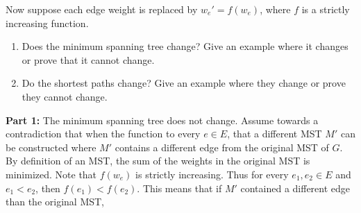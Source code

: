 \documentclass[11pt]{article}
\begin{document}
\begin{flushleft}
	Now suppose each edge weight is replaced by $w_e'=f(w_e)$,
	where $f$ is a strictly increasing function.
	\begin{enumerate}
		\item
		Does the minimum spanning tree change? Give an example
		where it changes or prove that it cannot change.
		\item
		Do the shortest paths change? Give an example where they
		change or prove they cannot change.
	\end{enumerate}

	\textbf{Part 1: }The minimum spanning tree does not change. Assume towards a contradiction that when the function to every $e \in E$, that a different MST $M'$ can be constructed where $M'$ contains a different edge from the original MST of $G$. By definition of an MST, the sum of the weights in the original MST is minimized. Note that $f(w_e)$ is strictly increasing. Thus for every $e_1, e_2 \in E$ and $e_1 < e_2$, then $f(e_1) < f(e_2)$. This means that if $M'$ contained a different edge than the original MST, 
	
\end{flushleft}
\end{document}

